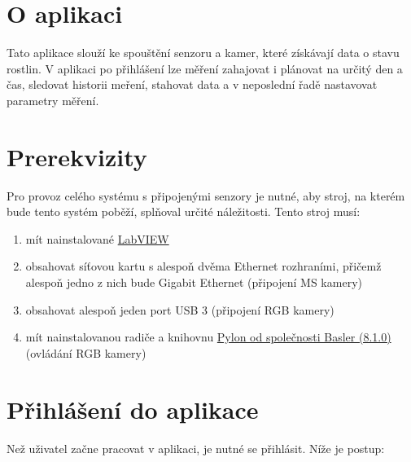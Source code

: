 \documentclass[12pt]{article}
\begin{document}
    \begin{teamwork}

        \section{O aplikaci}\label{sec:o-aplikace}

        Tato aplikace slouží ke spouštění senzoru a kamer, které získávají data o stavu rostlin.
        V aplikaci po přihlášení lze měření zahajovat i plánovat na určitý den a čas, sledovat historii meření,
        stahovat data a v neposlední řadě nastavovat parametry měření.

        \section{Prerekvizity}\label{sec:prerekvizity}

        Pro provoz celého systému s připojenými senzory je nutné, aby stroj, na kterém bude tento
        systém poběží, splňoval určité náležitosti.
        Tento stroj musí:

        \begin{enumerate}
            \item mít nainstalované \href{https://www.ni.com/en/support/downloads/software-products/download.labview.html#559067}{LabVIEW}
            \item obsahovat síťovou kartu s alespoň dvěma Ethernet rozhraními, přičemž alespoň jedno z
            nich bude Gigabit Ethernet (připojení MS kamery)
            \item obsahovat alespoň jeden port USB 3 (připojení RGB kamery)
            \item mít nainstalovanou radiče a knihovnu \href{https://www.baslerweb.com/en/downloads/software/?downloadCategory.values.label.data=pylon}{Pylon od společnosti Basler (8.1.0)} (ovládání RGB kamery)
        \end{enumerate}


        \section{Přihlášení do aplikace}\label{sec:prihlaseni-do-aplikace}

        Než uživatel začne pracovat v aplikaci, je nutné se přihlásit.
        Níže je postup:


\end{teamwork}
\end{document}
